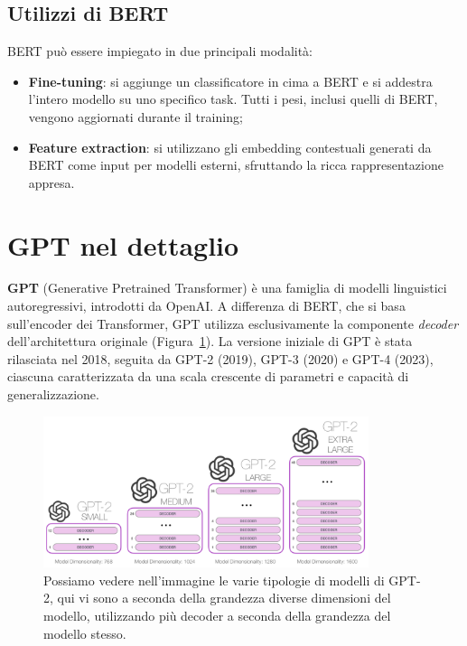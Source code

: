\subsection{Utilizzi di BERT}

BERT può essere impiegato in due principali modalità:

\begin{itemize}
    \item \textbf{Fine-tuning}: si aggiunge un classificatore in cima a BERT e si addestra l'intero modello su uno specifico task. Tutti i pesi, inclusi quelli di BERT, vengono aggiornati durante il training;
    \item \textbf{Feature extraction}: si utilizzano gli embedding contestuali generati da BERT come input per modelli esterni, sfruttando la ricca rappresentazione appresa.
\end{itemize}

\section{GPT nel dettaglio}

\textbf{GPT} (Generative Pretrained Transformer) è una famiglia di modelli linguistici autoregressivi, introdotti da OpenAI. A differenza di BERT, che si basa sull’encoder dei Transformer, GPT utilizza esclusivamente la componente \textit{decoder} dell'architettura originale (Figura~\ref{fig:GPTModel}). La versione iniziale di GPT è stata rilasciata nel 2018, seguita da GPT-2 (2019), GPT-3 (2020) e GPT-4 (2023), ciascuna caratterizzata da una scala crescente di parametri e capacità di generalizzazione.

\begin{figure}
    \centering
    \includegraphics[width=0.85\textwidth]{figure/GPTModel}
    \caption{Possiamo vedere nell'immagine le varie tipologie di modelli di GPT-2, qui vi sono a seconda della grandezza diverse dimensioni del modello, utilizzando più decoder a seconda della grandezza del modello stesso.}
    \label{fig:GPTModel}
\end{figure}

